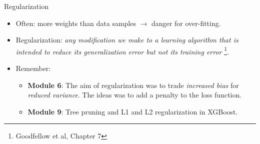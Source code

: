\documentclass[
  10pt,
  ignorenonframetext,
]{beamer}
\providecommand{\tightlist}{%
  \setlength{\itemsep}{0pt}\setlength{\parskip}{0pt}}
\begin{document}
\begin{frame}
\begin{block}{Regularization}
\protect\hypertarget{regularization}{}
\(~\)

\begin{itemize}
\tightlist
\item
  Often: more weights than data samples \(\rightarrow\) danger for
  over-fitting.
\end{itemize}

\vspace{2mm}

\begin{itemize}
\tightlist
\item
  Regularization: \emph{any modification we make to a learning algorithm
  that is intended to reduce its generalization error but not its
  training error} \footnote{Goodfellow et al, Chapter 7}.
\end{itemize}

\vspace{2mm}

\begin{itemize}
\item
  Remember:\vspace{2mm}

  \begin{itemize}
  \tightlist
  \item
    \textbf{Module 6}: The aim of regularization was to trade
    \emph{increased bias} for \emph{reduced variance}. The ideas was to
    add a penalty to the loss function. \vspace{1mm}
  \item
    \textbf{Module 9}: Tree pruning and L1 and L2 regularization in
    XGBoost.
  \end{itemize}
\end{itemize}

\vspace{2mm}
\end{block}
\end{frame}
\end{document}
